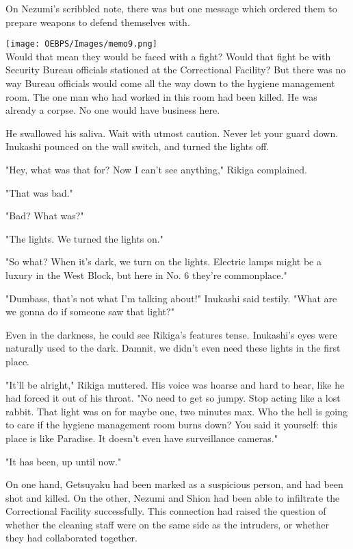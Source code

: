 On Nezumi's scribbled note, there was but one message which ordered them
to prepare weapons to defend themselves with.

\texttt{[image: OEBPS/Images/memo9.png]}\\

Would that mean they would be faced with a fight? Would that fight be
with Security Bureau officials stationed at the Correctional Facility?
But there was no way Bureau officials would come all the way down to the
hygiene management room. The one man who had worked in this room had
been killed. He was already a corpse. No one would have business here.

He swallowed his saliva. Wait with utmost caution. Never let your guard
down. Inukashi pounced on the wall switch, and turned the lights off.

"Hey, what was that for? Now I can't see anything," Rikiga complained.

"That was bad."

"Bad? What was?"

"The lights. We turned the lights on."

"So what? When it's dark, we turn on the lights. Electric lamps might be
a luxury in the West Block, but here in No. 6 they're commonplace."

"Dumbass, that's not what I'm talking about!" Inukashi said testily.
"What are we gonna do if someone saw that light?"

Even in the darkness, he could see Rikiga's features tense. Inukashi's
eyes were naturally used to the dark. Damnit, we didn't even need these
lights in the first place.

"It'll be alright," Rikiga muttered. His voice was hoarse and hard to
hear, like he had forced it out of his throat. "No need to get so jumpy.
Stop acting like a lost rabbit. That light was on for maybe one, two
minutes max. Who the hell is going to care if the hygiene management
room burns down? You said it yourself: this place is like Paradise. It
doesn't even have surveillance cameras."

"It has been, up until now."

On one hand, Getsuyaku had been marked as a suspicious person, and had
been shot and killed. On the other, Nezumi and Shion had been able to
infiltrate the Correctional Facility successfully. This connection had
raised the question of whether the cleaning staff were on the same side
as the intruders, or whether they had collaborated together.

